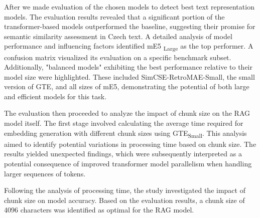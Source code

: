 After we made evaluation of the chosen models to detect best text representation models.
The evaluation results revealed that a significant portion of the transformer-based models outperformed the baseline, suggesting their promise for semantic similarity assessment in Czech text.
A detailed analysis of model performance and influencing factors identified \ac{mE5} \textsubscript{Large} as the top performer.
A confusion matrix visualized its evaluation on a specific benchmark subset.
Additionally, "balanced models" exhibiting the best performance relative to their model size were highlighted.
These included SimCSE-RetroMAE-Small, the small version of \ac{GTE}, and all sizes of \ac{mE5}, demonstrating the potential of both large and efficient models for this task.

The evaluation then proceeded to analyze the impact of chunk size on the \ac{RAG} model itself.
The first stage involved calculating the average time required for embedding generation with different chunk sizes using \ac{GTE}\textsubscript{Small}.
This analysis aimed to identify potential variations in processing time based on chunk size.
The results yielded unexpected findings, which were subsequently interpreted as a potential consequence of improved transformer model parallelism when handling larger sequences of tokens.

Following the analysis of processing time, the study investigated the impact of chunk size on model accuracy.
Based on the evaluation results, a chunk size of 4096 characters was identified as optimal for the \ac{RAG} model.


